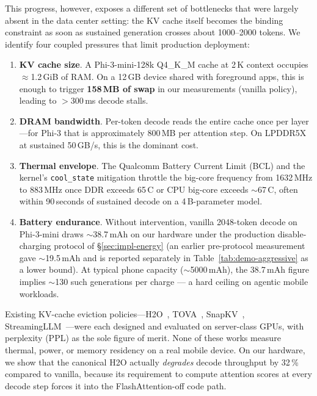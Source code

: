 \documentclass[sigconf, anonymous=false, screen=true]{acmart}
\newcommand{\bad}[1]{\textcolor{endurkvred}{\textbf{#1}}}
\begin{document}
This progress, however, exposes a different set of bottlenecks that were largely absent in the data center setting: the KV cache itself becomes the binding constraint as soon as sustained generation crosses about 1000--2000 tokens. We identify four coupled pressures that limit production deployment:

\begin{enumerate}
\item \textbf{KV cache size}. A Phi-3-mini-128k Q4\_K\_M cache at 2\,K context occupies $\approx$1.2\,GiB of RAM. On a 12\,GB device shared with foreground apps, this is enough to trigger \bad{158\,MB of swap} in our measurements (vanilla policy), leading to $>$300\,ms decode stalls.
\item \textbf{DRAM bandwidth}. Per-token decode reads the entire cache once per layer---for Phi-3 that is approximately 800\,MB per attention step. On LPDDR5X at sustained 50\,GB/s, this is the dominant cost.
\item \textbf{Thermal envelope}. The Qualcomm Battery Current Limit (BCL) and the kernel's \texttt{cool\_state} mitigation throttle the big-core frequency from 1632\,MHz to 883\,MHz once DDR exceeds 65\,\textdegree C or CPU big-core exceeds $\sim$67\,\textdegree C, often within 90\,seconds of sustained decode on a 4\,B-parameter model.
\item \textbf{Battery endurance}. Without intervention, vanilla 2048-token decode on Phi-3-mini draws $\sim$38.7\,mAh on our hardware under the production disable-charging protocol of \S\ref{sec:impl-energy} (an earlier pre-protocol measurement gave $\sim$19.5\,mAh and is reported separately in Table~\ref{tab:demo-aggressive} as a lower bound). At typical phone capacity ($\sim$5000\,mAh), the 38.7\,mAh figure implies $\sim$130 such generations per charge --- a hard ceiling on agentic mobile workloads.
\end{enumerate}

Existing KV-cache eviction policies---H2O~\cite{zhang2023h2o}, TOVA~\cite{oren2024tova}, SnapKV~\cite{li2024snapkv}, StreamingLLM~\cite{xiao2024streamingllm}---were each designed and evaluated on server-class GPUs, with perplexity (PPL) as the sole figure of merit. None of these works measure thermal, power, or memory residency on a real mobile device. On our hardware, we show that the canonical H2O actually \emph{degrades} decode throughput by 32\,\% compared to vanilla, because its requirement to compute attention scores at every decode step forces it into the FlashAttention-off code path.
\end{document}
